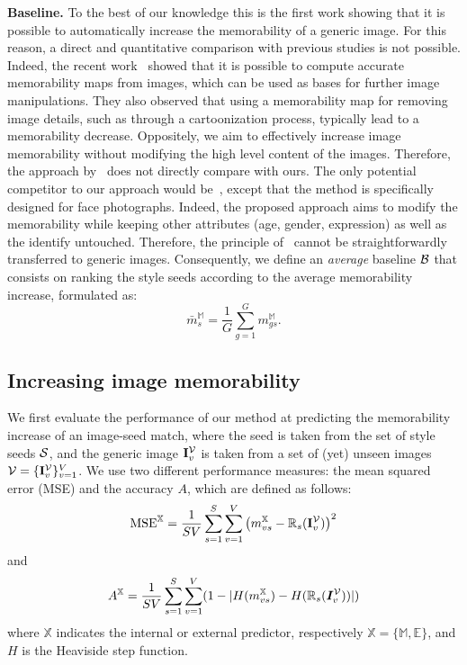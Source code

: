 \documentclass{sig-alternate-05-2015}
\begin{document}
\textbf{Baseline.} To the best of our knowledge this is the first work showing that it is possible to automatically increase the memorability of a generic image. For this reason, a direct and quantitative comparison with previous studies is not possible. Indeed, the recent work~\cite{khosla2015understanding} showed that it is possible to compute accurate memorability maps from images, which can be used as bases for further image manipulations. They also observed that using a memorability map for removing image details, such as through a cartoonization process, typically lead to a memorability decrease. Oppositely, we aim to effectively increase image memorability without modifying the high level content of the images. Therefore, the approach by~\cite{khosla2015understanding} does not directly compare with ours. The only potential competitor to our approach would be~\cite{khosla2013modifying}, except that the method is specifically designed for face photographs. Indeed, the proposed approach aims to modify the memorability while keeping other attributes (age, gender, expression) as well as the identify untouched. Therefore, the principle of~\cite{khosla2013modifying} cannot be straightforwardly transferred to generic images. Consequently, we define an \textit{average} baseline ${\cal B}$ that consists on ranking the style seeds according to the average memorability increase, formulated as:
\begin{equation}
\bar{m}_s^\mathbb{M} = \frac{1}{G} \sum_{g=1}^{G} m_{gs}^\mathbb{M}.
\end{equation}

\subsection{Increasing image memorability}
\label{sec:res-memorability}

We first evaluate the performance of our method at predicting the memorability increase of an image-seed match, where the seed is taken from the 
set of style seeds ${\cal S}$, and the generic image $\mathbf{I}_v^{\cal V}$ is taken from a set of (yet) unseen images ${\cal 
V}=\{\mathbf{I}_v^{\cal V}\}_{v=1}^V$. We use two different performance measures: the mean squared error (MSE) and the accuracy $A$, which are 
defined as follows:
\begin{equation}
\textrm{MSE}^\mathbb{X} = \frac{1}{SV} \sum_{s=1}^{S} \sum_{v=1}^{V} \left( m^\mathbb{X}_{vs} - \mathbb{R}_s(\mathbf{I}_v^{\cal V})\right)^2
\end{equation}
and
\begin{equation}
A^\mathbb{X} = \frac{1}{SV} \sum_{s=1}^{S} \sum_{v=1}^{V} ( 1-  | H ( m_{vs}^\mathbb{X})  -  H ( \mathbb{R}_s(\bm{I}_v^{\cal V}) ) |)
\end{equation}
where $\mathbb{X}$ indicates the internal or external predictor, respectively $\mathbb{X} = \{\mathbb{M},\mathbb{E}\}$, and $H$ is the Heaviside step function.
\end{document}
